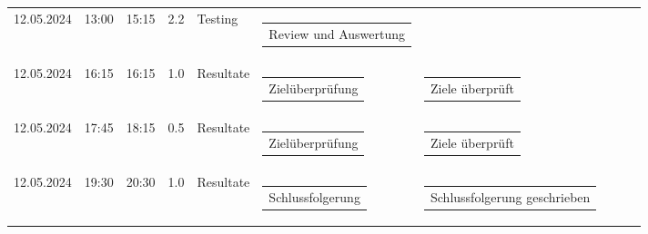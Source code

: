 {\begin{longtable}[H]{lllrllllll}
12.05.2024 & 13:00 & 15:15 & 2.2 & Testing & \begin{tabular}[c]{@{}l@{}}Review und Auswertung\end{tabular} & \begin{tabular}[c]{@{}l@{}}\end{tabular} & \begin{tabular}[c]{@{}l@{}}\end{tabular} & \begin{tabular}[c]{@{}l@{}}\end{tabular} & \begin{tabular}[c]{@{}l@{}}\end{tabular} \\
12.05.2024 & 16:15 & 16:15 & 1.0 & Resultate & \begin{tabular}[c]{@{}l@{}}Zielüberprüfung\end{tabular} & \begin{tabular}[c]{@{}l@{}}Ziele überprüft\end{tabular} & \begin{tabular}[c]{@{}l@{}}\end{tabular} & \begin{tabular}[c]{@{}l@{}}\end{tabular} & \begin{tabular}[c]{@{}l@{}}\end{tabular} \\
12.05.2024 & 17:45 & 18:15 & 0.5 & Resultate & \begin{tabular}[c]{@{}l@{}}Zielüberprüfung\end{tabular} & \begin{tabular}[c]{@{}l@{}}Ziele überprüft\end{tabular} & \begin{tabular}[c]{@{}l@{}}\end{tabular} & \begin{tabular}[c]{@{}l@{}}\end{tabular} & \begin{tabular}[c]{@{}l@{}}\end{tabular} \\
12.05.2024 & 19:30 & 20:30 & 1.0 & Resultate & \begin{tabular}[c]{@{}l@{}}Schlussfolgerung\end{tabular} & \begin{tabular}[c]{@{}l@{}}Schlussfolgerung geschrieben\end{tabular} & \begin{tabular}[c]{@{}l@{}}\end{tabular} & \begin{tabular}[c]{@{}l@{}}\end{tabular} & \begin{tabular}[c]{@{}l@{}}\end{tabular} \\

\end{longtable}}
